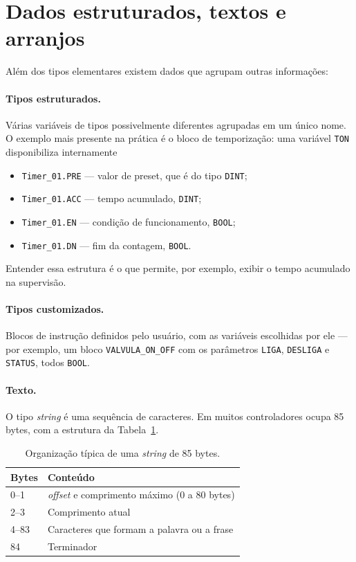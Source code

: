 
\section{Dados estruturados, textos e arranjos}

Além dos tipos elementares existem dados que agrupam outras informações:

\paragraph{Tipos estruturados.} Várias variáveis de tipos possivelmente diferentes agrupadas em um
único nome. O exemplo mais presente na prática é o bloco de temporização: uma variável \texttt{TON}
disponibiliza internamente

\begin{itemize}
  \item \texttt{Timer\_01.PRE} --- valor de preset, que é do tipo \texttt{DINT};
  \item \texttt{Timer\_01.ACC} --- tempo acumulado, \texttt{DINT};
  \item \texttt{Timer\_01.EN} --- condição de funcionamento, \texttt{BOOL};
  \item \texttt{Timer\_01.DN} --- fim da contagem, \texttt{BOOL}.
\end{itemize}

Entender essa estrutura é o que permite, por exemplo, exibir o tempo acumulado na supervisão.

\paragraph{Tipos customizados.} Blocos de instrução definidos pelo usuário, com as variáveis
escolhidas por ele --- por exemplo, um bloco \texttt{VALVULA\_ON\_OFF} com os parâmetros
\texttt{LIGA}, \texttt{DESLIGA} e \texttt{STATUS}, todos \texttt{BOOL}.

\paragraph{Texto.} O tipo \emph{string} é uma sequência de caracteres. Em muitos controladores ocupa
85 bytes, com a estrutura da Tabela~\ref{tab:string}.

\begin{table}[H]
  \centering
  \caption{Organização típica de uma \emph{string} de 85 bytes.}
  \label{tab:string}
  \begin{tabular}{l l}
    \toprule
    Bytes & Conteúdo \\
    \midrule
    0--1 & \emph{offset} e comprimento máximo (0 a 80 bytes) \\
    2--3 & Comprimento atual \\
    4--83 & Caracteres que formam a palavra ou a frase \\
    84 & Terminador \\
    \bottomrule
  \end{tabular}
\end{table}

